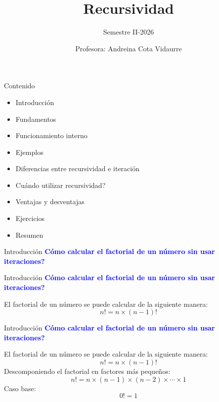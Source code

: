 \documentclass{beamer}
\title{Recursividad} %
\subtitle{Semestre II-2026} %
\author{Profesora: Andreina Cota Vidaurre}
\begin{document}
  \shorthandoff{-}
  \frame[c]{\maketitle}

    \begin{frame}{Contenido}
        \begin{itemize}
            \item Introducción
            \item Fundamentos
            \item Funcionamiento interno
            \item Ejemplos
            \item Diferencias entre recursividad e iteración
            \item Cuándo utilizar recursividad?
            \item Ventajas y desventajas
            \item Ejercicios
            \item Resumen
        \end{itemize}
    \end{frame}

    \begin{frame}{Introducción}
        \textcolor{blue}{\textbf{Cómo calcular el factorial de un número sin usar iteraciones?}}
    \end{frame}

    \begin{frame}{Introducción}
        \textcolor{blue}{\textbf{Cómo calcular el factorial de un número sin usar iteraciones?}}

        El factorial de un número se puede calcular de la siguiente manera:
        \begin{equation}
            n! = n \times (n-1)!
        \end{equation}
    \end{frame}

    \begin{frame}{Introducción}
        \setcounter{equation}{0}
        \textcolor{blue}{\textbf{Cómo calcular el factorial de un número sin usar iteraciones?}}

        El factorial de un número se puede calcular de la siguiente manera:
        \begin{equation}
            n! = n \times (n-1)!
        \end{equation}
        Descomponiendo el factorial en factores más pequeños:
        \begin{equation}
            n! = n \times (n-1) \times (n-2) \times \cdots \times 1
        \end{equation}
        Caso base:
        \begin{equation}
            0! = 1
        \end{equation}
    \end{frame}
\end{document}
